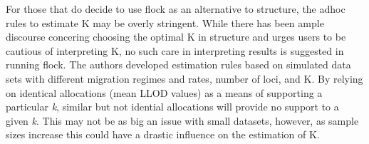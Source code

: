 For those that do decide to use {\sc flock} as an alternative to {\sc structure}, the adhoc rules 
to estimate K may be overly stringent. While there has been ample 
discourse concering choosing the optimal K in  {\sc structure} \citep{Evannoetal2005, 
Pritchardetal2000, Wap&Gag2006} and \citet{Pritchardetal2000} urges users 
to be cautious of interpreting K, no such care in interpreting results 
is suggested in running {\sc flock}. The authors developed estimation rules based on simulated data 
sets with different migration regimes and rates, number of loci, and K. 
By relying on identical allocations (mean LLOD values) as a means of supporting 
a particular \textit{k},  similar but not idential 
allocations will provide no support to a given \textit{k}. This may not be as big an issue with small datasets,
however, as sample sizes increase this could have a drastic influence on the estimation of 
K. 



 

